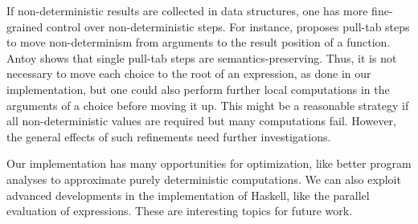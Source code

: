 \documentclass{llncs}
\begin{document}
If non-deterministic results are collected in data structures,
one has more fine-grained control over non-deterministic steps.
For instance, \cite{AlqaddoumiAntoyFischerReck10} proposes
pull-tab steps to move non-determinism from arguments to
the result position of a function. Antoy \cite{Antoy11ICLP}
shows that single pull-tab steps are semantics-preserving.
Thus, it is not necessary to move each choice to the root
of an expression, as done in our implementation,
but one could also perform further local computations in the arguments
of a choice before moving it up. This might be a reasonable strategy
if all non-deterministic values are required but many computations fail.
However, the general effects of such refinements need further
investigations.

Our implementation has many opportunities for optimization, like
better program analyses to approximate purely deterministic computations.
We can also exploit advanced developments
in the implementation of Haskell, like the parallel evaluation of
expressions. These are interesting topics for future work.
\end{document}
